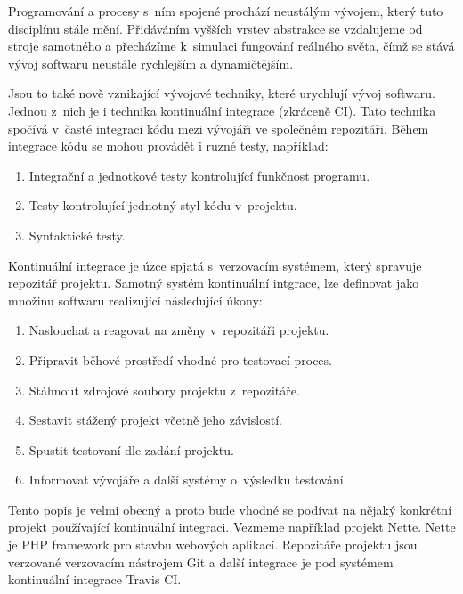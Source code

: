 \begin{introduction}

Programování a procesy s~ním spojené prochází neustálým vývojem, který tuto disciplínu stále mění. 
Přidáváním vyšších vrstev abstrakce se vzdalujeme od stroje samotného a přecházíme k~simulaci fungování reálného světa, čímž se stává vývoj softwaru neustále rychlejším a dynamičtějším. 

Jsou to také nově vznikající vývojové techniky, které urychlují vývoj softwaru.
Jednou z~nich je i technika kontinuální integrace (zkráceně CI).
Tato technika spočívá v~časté integraci kódu mezi vývojáři ve společném repozitáři.
Během integrace kódu se mohou provádět i ruzné testy, například:

\begin{enumerate}
	\item Integrační a jednotkové testy kontrolující funkčnost programu.
	\item Testy kontrolující jednotný styl kódu v~projektu.
	\item Syntaktické testy.
\end{enumerate}

Kontinuální integrace je úzce spjatá s~verzovacím systémem, který spravuje repozitář projektu.
Samotný systém kontinuální intgrace, lze definovat jako množinu softwaru realizující následující úkony:

\begin{enumerate}
	\item Naslouchat a reagovat na změny v~repozitáři projektu.
	\item Připravit běhové prostředí vhodné pro testovací proces.
	\item Stáhnout zdrojové soubory projektu z~repozitáře.
	\item Sestavit stážený projekt včetně jeho závislostí.
	\item Spustit testovaní dle zadání projektu.
	\item Informovat vývojáře a další systémy o~výsledku testování.
\end{enumerate}

\end{introduction}

Tento popis je velmi obecný a proto bude vhodné se podívat na nějaký konkrétní projekt používající kontinuální integraci.
Vezmeme například projekt Nette.
Nette je PHP framework pro stavbu webových aplikací.
Repozitáře projektu jsou verzované verzovacím nástrojem Git a další integrace je pod systémem kontinuální integrace Travis CI.


